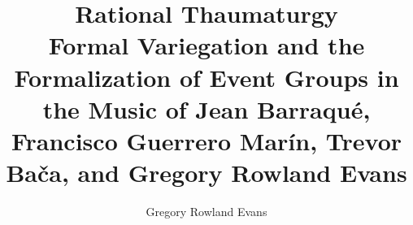 \title{Rational Thaumaturgy \\ \vspace{0.35cm} \Large Formal Variegation and the Formalization of Event Groups in the Music of Jean Barraqué, Francisco Guerrero Marín, Trevor Bača, and Gregory Rowland Evans}
\author{Gregory Rowland Evans}



